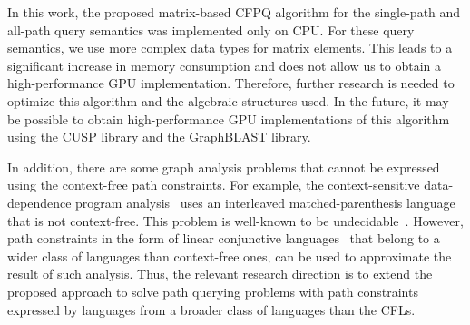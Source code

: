In this work, the proposed matrix-based CFPQ algorithm for the single-path and all-path query semantics was implemented only on CPU. For these query semantics, we use more complex data types for matrix elements. This leads to a significant increase in memory consumption and does not allow us to obtain a high-performance GPU implementation. Therefore, further research is needed to optimize this algorithm and the algebraic structures used. In the future, it may be possible to obtain high-performance GPU implementations of this algorithm using the CUSP library and the GraphBLAST library.

In addition, there are some graph analysis problems that cannot be expressed using the context-free path constraints. For example, the context-sensitive data-dependence program analysis~\cite{linearconjunctive} uses an interleaved matched-parenthesis language that is not context-free. This problem is well-known to be undecidable~\cite{linearconjunctive}. However, path constraints in the form of linear conjunctive languages~\cite{okhotin2001conjunctive} that belong to a wider class of languages than context-free ones, can be used to approximate the result of such analysis. Thus, the relevant research direction is to extend the proposed approach to solve path querying problems with path constraints expressed by languages from a broader class of languages than the CFLs.
